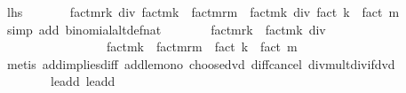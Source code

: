 \begin{isabellebody}
\ {\isachardoublequoteopen}{\isacharquery}{\kern0pt}lhs\ {\isacharequal}{\kern0pt}\isanewline
\ \ \ \ \ \ fact{\isacharparenleft}{\kern0pt}m{\isacharplus}{\kern0pt}r{\isacharplus}{\kern0pt}k{\isacharparenright}{\kern0pt}\ div\ {\isacharparenleft}{\kern0pt}fact{\isacharparenleft}{\kern0pt}m{\isacharplus}{\kern0pt}k{\isacharparenright}{\kern0pt}\ {\isacharasterisk}{\kern0pt}\ fact{\isacharparenleft}{\kern0pt}m{\isacharplus}{\kern0pt}r{\isacharminus}{\kern0pt}m{\isacharparenright}{\kern0pt}{\isacharparenright}{\kern0pt}\ {\isacharasterisk}{\kern0pt}\ {\isacharparenleft}{\kern0pt}fact{\isacharparenleft}{\kern0pt}m{\isacharplus}{\kern0pt}k{\isacharparenright}{\kern0pt}\ div\ {\isacharparenleft}{\kern0pt}fact\ k\ {\isacharasterisk}{\kern0pt}\ fact\ m{\isacharparenright}{\kern0pt}{\isacharparenright}{\kern0pt}{\isachardoublequoteclose}\isanewline
\ \ \ \ \isamarkupfalse%
\ {\isacharparenleft}{\kern0pt}simp\ add{\isacharcolon}{\kern0pt}\ binomial{\isacharunderscore}{\kern0pt}altdef{\isacharunderscore}{\kern0pt}nat{\isacharparenright}{\kern0pt}\isanewline
\ \ \isamarkupfalse%
\ \isamarkupfalse%
\ {\isachardoublequoteopen}{\isasymdots}\ {\isacharequal}{\kern0pt}\ fact{\isacharparenleft}{\kern0pt}m{\isacharplus}{\kern0pt}r{\isacharplus}{\kern0pt}k{\isacharparenright}{\kern0pt}\ {\isacharasterisk}{\kern0pt}\ fact{\isacharparenleft}{\kern0pt}m{\isacharplus}{\kern0pt}k{\isacharparenright}{\kern0pt}\ div\isanewline
\ \ \ \ \ \ \ \ \ \ \ \ \ \ \ \ \ {\isacharparenleft}{\kern0pt}fact{\isacharparenleft}{\kern0pt}m{\isacharplus}{\kern0pt}k{\isacharparenright}{\kern0pt}\ {\isacharasterisk}{\kern0pt}\ fact{\isacharparenleft}{\kern0pt}m{\isacharplus}{\kern0pt}r{\isacharminus}{\kern0pt}m{\isacharparenright}{\kern0pt}\ {\isacharasterisk}{\kern0pt}\ {\isacharparenleft}{\kern0pt}fact\ k\ {\isacharasterisk}{\kern0pt}\ fact\ m{\isacharparenright}{\kern0pt}{\isacharparenright}{\kern0pt}{\isachardoublequoteclose}\isanewline
\ \ \ \ \isamarkupfalse%
\ {\isacharparenleft}{\kern0pt}metis\ add{\isacharunderscore}{\kern0pt}implies{\isacharunderscore}{\kern0pt}diff\ add{\isacharunderscore}{\kern0pt}le{\isacharunderscore}{\kern0pt}mono{}\ choose{\isacharunderscore}{\kern0pt}dvd\ diff{\isacharunderscore}{\kern0pt}cancel{}\ div{\isacharunderscore}{\kern0pt}mult{\isacharunderscore}{\kern0pt}div{\isacharunderscore}{\kern0pt}if{\isacharunderscore}{\kern0pt}dvd\isanewline
\ \ \ \ \ \ \ \ le{\isacharunderscore}{\kern0pt}add{}\ le{\isacharunderscore}{\kern0pt}add{}{\isacharparenright}{\kern0pt}\isanewline

\end{isabellebody}
